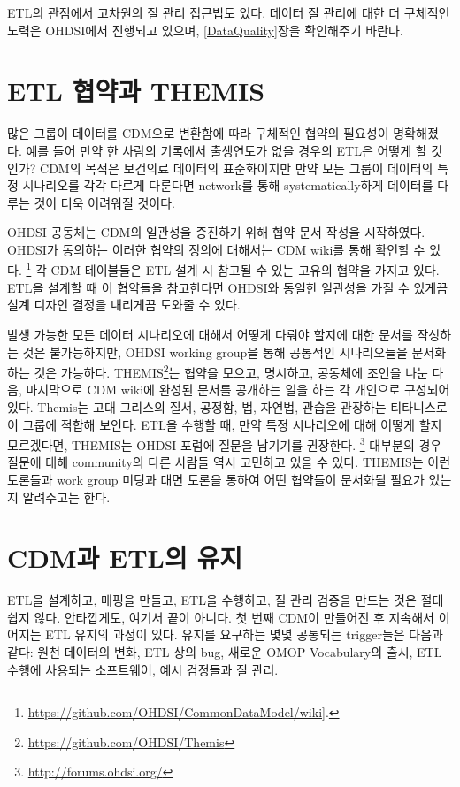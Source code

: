 \documentclass[11pt]{book}
\let\rmarkdownfootnote\footnote%
\def\footnote{\protect\rmarkdownfootnote}
\theoremstyle{definition}
\theoremstyle{definition}
\theoremstyle{definition}
\theoremstyle{remark}
\begin{document}
ETL의 관점에서 고차원의 질 관리 접근법도 있다. 데이터 질 관리에 대한 더
구체적인 노력은 OHDSI에서 진행되고 있으며, \ref{DataQuality}장을
확인해주기 바란다.

\section{ETL 협약과 THEMIS}\label{etl--themis}

많은 그룹이 데이터를 CDM으로 변환함에 따라 구체적인 협약의 필요성이
명확해졌다. 예를 들어 만약 한 사람의 기록에서 출생연도가 없을 경우의
ETL은 어떻게 할 것인가? CDM의 목적은 보건의료 데이터의 표준화이지만 만약
모든 그룹이 데이터의 특정 시나리오를 각각 다르게 다룬다면 network를 통해
systematically하게 데이터를 다루는 것이 더욱 어려워질 것이다.

OHDSI 공동체는 CDM의 일관성을 증진하기 위해 협약 문서 작성을 시작하였다.
OHDSI가 동의하는 이러한 협약의 정의에 대해서는 CDM wiki를 통해 확인할 수
있다. \footnote{\url{https://github.com/OHDSI/CommonDataModel/wiki}{]}.}
각 CDM 테이블들은 ETL 설계 시 참고될 수 있는 고유의 협약을 가지고 있다.
ETL을 설계할 때 이 협약들을 참고한다면 OHDSI와 동일한 일관성을 가질 수
있게끔 설계 디자인 결정을 내리게끔 도와줄 수 있다.

발생 가능한 모든 데이터 시나리오에 대해서 어떻게 다뤄야 할지에 대한
문서를 작성하는 것은 불가능하지만, OHDSI working group을 통해 공통적인
시나리오들을 문서화하는 것은 가능하다. THEMIS\footnote{\url{https://github.com/OHDSI/Themis}}는
협약을 모으고, 명시하고, 공동체에 조언을 나눈 다음, 마지막으로 CDM
wiki에 완성된 문서를 공개하는 일을 하는 각 개인으로 구성되어 있다.
Themis는 고대 그리스의 질서, 공정함, 법, 자연법, 관습을 관장하는
티타니스로 이 그룹에 적합해 보인다. ETL을 수행할 때, 만약 특정
시나리오에 대해 어떻게 할지 모르겠다면, THEMIS는 OHDSI 포럼에 질문을
남기기를 권장한다. \footnote{\url{http://forums.ohdsi.org/}} 대부분의
경우 질문에 대해 community의 다른 사람들 역시 고민하고 있을 수 있다.
THEMIS는 이런 토론들과 work group 미팅과 대면 토론을 통하여 어떤
협약들이 문서화될 필요가 있는지 알려주고는 한다.

\section{CDM과 ETL의 유지}\label{CDMandETLMaintenance}

ETL을 설계하고, 매핑을 만들고, ETL을 수행하고, 질 관리 검증을 만드는
것은 절대 쉽지 않다. 안타깝게도, 여기서 끝이 아니다. 첫 번째 CDM이
만들어진 후 지속해서 이어지는 ETL 유지의 과정이 있다. 유지를 요구하는
몇몇 공통되는 trigger들은 다음과 같다: 원천 데이터의 변화, ETL 상의 bug,
새로운 OMOP Vocabulary의 출시, ETL 수행에 사용되는 소프트웨어, 예시
검정들과 질 관리.
\end{document}
